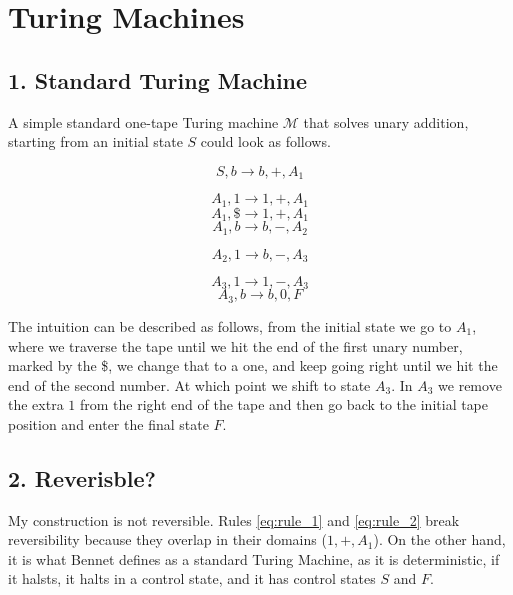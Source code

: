\documentclass[12pt]{report}
\begin{document}
\section*{Turing Machines}
  \subsection*{1. Standard Turing Machine}
    A simple standard one-tape Turing machine $\mathcal{M}$ that solves unary addition, starting from an initial state $S$ could look as follows.

  \begin{equation}
      S,b \rightarrow  b, +, A_1  \label{eq:rule_1}
    \end{equation}

    \begin{equation}
      A_1,1 \rightarrow  1, +, A_1  \label{eq:rule_2}
    \end{equation}
    \begin{equation}
      A_1,\$ \rightarrow  1, +, A_1  \label{eq:rule_3}
    \end{equation}
    \begin{equation}
      A_1,b \rightarrow  b, -, A_2  \label{eq:rule_4}
    \end{equation}
    
    \begin{equation}
      A_2,1 \rightarrow  b, -, A_3  \label{eq:rule_5}
    \end{equation}

    \begin{equation}
      A_3,1 \rightarrow  1, -, A_3  \label{eq:rule_6}
    \end{equation}
    \begin{equation}
      A_3,b \rightarrow  b, 0, F  \label{eq:rule_7}
    \end{equation}


    The intuition can be described as follows, from the initial state we go to $A_1$, where we traverse the tape until we hit the end of the first unary number, marked by the \$, we change that to a one, and keep going right until we hit the end of the second number. At which point we shift to state $A_3$. In $A_3$ we remove the extra $1$ from the right end of the tape and then go back to the initial tape position  and enter the final state $F$.


  \subsection*{2. Reverisble?}
    My construction is not reversible. Rules \ref{eq:rule_1} and \ref{eq:rule_2} break reversibility because they overlap in their domains ($1,+,A_1$). On the other hand, it is what Bennet defines as a standard Turing Machine, as it is deterministic, if it halsts, it halts in a control state, and it has control states $S$ and $F$.
\end{document}

